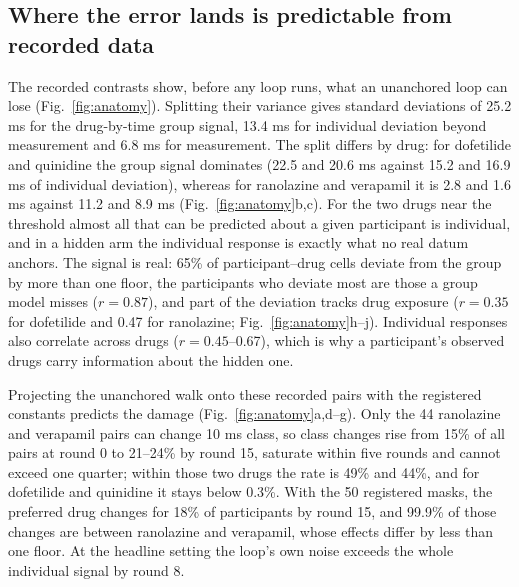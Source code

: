 \documentclass[11pt,a4paper]{article}
\begin{document}
\subsection{Where the error lands is predictable from recorded data}
The recorded contrasts show, before any loop runs, what an unanchored loop can lose (Fig.~\ref{fig:anatomy}). Splitting their variance gives standard deviations of 25.2 ms for the drug-by-time group signal, 13.4 ms for individual deviation beyond measurement and 6.8 ms for measurement. The split differs by drug: for dofetilide and quinidine the group signal dominates (22.5 and 20.6 ms against 15.2 and 16.9 ms of individual deviation), whereas for ranolazine and verapamil it is 2.8 and 1.6 ms against 11.2 and 8.9 ms (Fig.~\ref{fig:anatomy}b,c). For the two drugs near the threshold almost all that can be predicted about a given participant is individual, and in a hidden arm the individual response is exactly what no real datum anchors. The signal is real: 65\% of participant--drug cells deviate from the group by more than one floor, the participants who deviate most are those a group model misses ($r=0.87$), and part of the deviation tracks drug exposure ($r=0.35$ for dofetilide and 0.47 for ranolazine; Fig.~\ref{fig:anatomy}h--j). Individual responses also correlate across drugs ($r=0.45$--0.67), which is why a participant's observed drugs carry information about the hidden one.

Projecting the unanchored walk onto these recorded pairs with the registered constants predicts the damage (Fig.~\ref{fig:anatomy}a,d--g). Only the 44 ranolazine and verapamil pairs can change 10 ms class, so class changes rise from 15\% of all pairs at round 0 to 21--24\% by round 15, saturate within five rounds and cannot exceed one quarter; within those two drugs the rate is 49\% and 44\%, and for dofetilide and quinidine it stays below 0.3\%. With the 50 registered masks, the preferred drug changes for 18\% of participants by round 15, and 99.9\% of those changes are between ranolazine and verapamil, whose effects differ by less than one floor. At the headline setting the loop's own noise exceeds the whole individual signal by round 8.
\end{document}
